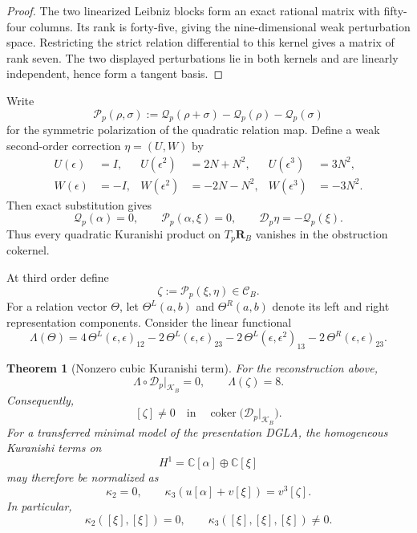 \documentclass[11pt]{amsart}
\newtheorem{theorem}{Theorem}[section]
\newcommand{\coker}{\operatorname{coker}}
\newcommand{\cD}{\mathscr D}
\newcommand{\cQ}{\mathscr Q}
\newcommand{\cP}{\mathscr P}
\newcommand{\C}{\mathbb C}
\newcommand{\Rel}{\mathscr C}
\begin{document}
\begin{proof}
The two linearized Leibniz blocks form an exact rational matrix with fifty-four columns.  Its rank is forty-five, giving the nine-dimensional weak perturbation space.  Restricting the strict relation differential to this kernel gives a matrix of rank seven.  The two displayed perturbations lie in both kernels and are linearly independent, hence form a tangent basis.
\end{proof}

Write
\[
\cP_p(\rho,\sigma)
:=
\cQ_p(\rho+\sigma)-\cQ_p(\rho)-\cQ_p(\sigma)
\]
for the symmetric polarization of the quadratic relation map.  Define a weak second-order correction $\eta=(U,W)$ by
\begin{align*}
U(\epsilon)&=I,
&U(\epsilon^2)&=2N+N^2,
&U(\epsilon^3)&=3N^2,\\
W(\epsilon)&=-I,
&W(\epsilon^2)&=-2N-N^2,
&W(\epsilon^3)&=-3N^2.
\end{align*}
Then exact substitution gives
\begin{equation}\label{eq:cubic-second-lift}
\cQ_p(\alpha)=0,
\qquad
\cP_p(\alpha,\xi)=0,
\qquad
\cD_p\eta=-\cQ_p(\xi).
\end{equation}
Thus every quadratic Kuranishi product on $T_p\mathbf R_B$ vanishes in the obstruction cokernel.

At third order define
\[
\zeta:=\cP_p(\xi,\eta)\in\Rel_B.
\]
For a relation vector $\Theta$, let $\Theta^L(a,b)$ and $\Theta^R(a,b)$ denote its left and right representation components.  Consider the linear functional
\begin{equation}\label{eq:cubic-certificate}
\Lambda(\Theta)
=
4\,\Theta^L(\epsilon,\epsilon)_{12}
-2\,\Theta^L(\epsilon,\epsilon)_{23}
-2\,\Theta^L(\epsilon,\epsilon^2)_{13}
-2\,\Theta^R(\epsilon,\epsilon)_{23}.
\end{equation}

\begin{theorem}[Nonzero cubic Kuranishi term]\label{thm:cubic-kuranishi}
For the reconstruction above,
\[
\Lambda\circ\cD_p|_{\mathcal K_B}=0,
\qquad
\Lambda(\zeta)=8.
\]
Consequently,
\[
[\zeta]\ne0
\quad\text{in}\quad
\coker\bigl(\cD_p|_{\mathcal K_B}\bigr).
\]
For a transferred minimal model of the presentation DGLA, the homogeneous Kuranishi terms on
\[
H^1=\C[\alpha]\oplus\C[\xi]
\]
may therefore be normalized as
\[
\boxed{
\kappa_2=0,
\qquad
\kappa_3(u[\alpha]+v[\xi])=v^3[\zeta].
}
\]
In particular,
\[
\kappa_2([\xi],[\xi])=0,
\qquad
\kappa_3([\xi],[\xi],[\xi])\ne0.
\]
\end{theorem}
\end{document}
